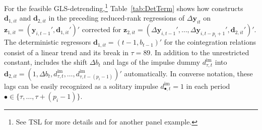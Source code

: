 For the feasible GLS-detrending,\footnote{See TSL \citeyearpar[p.~335]{TrenklerEtAl2008} for more details and \citet[Ch.~6]{ArsovaOersal2020} for another panel example.} Table~\ref{tab:DetTerm} shows how  constructs $ \boldsymbol{d}_{1,it} $ and $ \boldsymbol{d}_{2,it} $ in the preceding reduced-rank regressions of $ \Delta \boldsymbol{y}_{it} $ on $ \boldsymbol{z}_{1,it} = \left( \boldsymbol{y}_{i,t-1}', \boldsymbol{d}_{1,it}' \right)' $ corrected for $ \boldsymbol{z}_{2,it} = \left( \Delta \boldsymbol{y}_{i,t-1}', \ldots, \Delta \boldsymbol{y}_{i,t-p_i+1}', \boldsymbol{d}_{2,it}' \right)' $. The deterministic regressors $ \boldsymbol{d}_{1,it} = \left( t-1, b_{t-1}^{\ } \right)' $ for the cointegration relations consist of a linear trend and its break in $ \tau=89 $. In addition to the unrestricted constant,  includes the shift $ \Delta b_{t} $ and lags of the impulse dummy $  d^{\text{im}}_{\tau,t} $ into $ \boldsymbol{d}_{2,it} = \left( 1, \Delta b_{t}^{\ }, d^{\text{im}}_{\tau,t}, \ldots, d^{\text{im}}_{\tau,t-(p_i-1)} \right)' $ automatically. In converse notation, these lags can be easily recognized as a solitary impulse $  d^{\text{im}}_{\bullet,t} = 1 $ in each period $ \bullet \in \{ \tau, \ldots, \tau+(p_i-1)\} $. %


